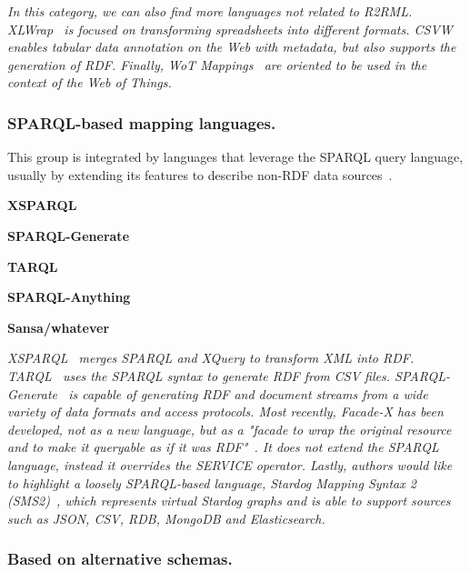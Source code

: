 \textit{In this category, we can also find more languages not related to R2RML. XLWrap~\parencite{langegger2009xlwrap} is focused on transforming spreadsheets into different formats. CSVW~\parencite{Tennison2015csvw} enables tabular data annotation on the Web with metadata, but also supports the generation of RDF. Finally, WoT Mappings~\parencite{cimmino2020ewot} are oriented to be used in the context of the Web of Things.}




\subsubsection{SPARQL-based mapping languages.}
\label{sec:chp2_SPARQL-languages} 

This group is integrated by languages that leverage the SPARQL query language, usually by extending its features to describe non-RDF data sources~\parencite{harris2013sparql}. 


\noindent\textbf{XSPARQL}~\parencite{Bischof2012xsparql}

\noindent\textbf{SPARQL-Generate}~\parencite{Lefrancois2017sparqlgenerate}

\noindent\textbf{TARQL}~\parencite{tarql}

\noindent\textbf{SPARQL-Anything}~\parencite{asprino2023sparql-anything}

\noindent\textbf{Sansa/whatever}~\parencite{stadler2023spark}




\textit{XSPARQL~\parencite{Bischof2012xsparql} merges SPARQL and XQuery to transform XML into RDF. TARQL~\parencite{tarql} uses the SPARQL syntax to generate RDF from CSV files. SPARQL-Generate~\parencite{Lefrancois2017sparqlgenerate} is capable of generating RDF and document streams from a wide variety of data formats and access protocols. Most recently, Facade-X has been developed, not as a new language, but as a "\textit{facade} to wrap the original resource and to make it queryable as if it was RDF"~\parencite{asprino2023sparql-anything}. It does not extend the SPARQL language, instead it overrides the SERVICE operator. Lastly, authors would like to highlight a loosely SPARQL-based language, Stardog Mapping Syntax 2 (SMS2)~\parencite{sms2}, which represents virtual Stardog graphs and is able to support sources such as JSON, CSV, RDB, MongoDB and Elasticsearch.}




\subsubsection{Based on alternative schemas.} 
\label{sec:chp2_alternative-languages}

